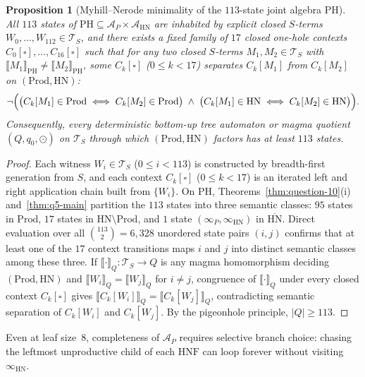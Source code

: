 \documentclass[11pt,reqno]{amsart}
\numberwithin{equation}{section}
\theoremstyle{plain}
\newtheorem{proposition}[theorem]{Proposition}
\theoremstyle{definition}
\theoremstyle{remark}
\newcommand{\TS}{\mathcal{T}_S}
\newcommand{\HNF}{\mathrm{HNF}}
\newcommand{\HN}{\mathrm{HN}}
\newcommand{\Prod}{\mathrm{Prod}}
\newcommand{\sem}[1]{\llbracket #1 \rrbracket}
\begin{document}
\begin{proposition}[Myhill--Nerode minimality of the $113$-state joint algebra $\mathrm{PH}$]\label{prop:ph-113-minimal}
All $113$ states of $\mathrm{PH} \subseteq \mathcal{A}_P \times \mathcal{A}_{\HN}$ are inhabited by explicit closed $S$-terms $W_0, \dots, W_{112} \in \TS$, and there exists a fixed family of $17$ closed one-hole contexts $C_0[\square], \dots, C_{16}[\square]$ such that for any two closed $S$-terms $M_1, M_2 \in \TS$ with $\sem{M_1}_{\mathrm{PH}} \neq \sem{M_2}_{\mathrm{PH}}$, some $C_k[\square]$ ($0 \le k < 17$) separates $C_k[M_1]$ from $C_k[M_2]$ on $(\Prod, \HN)$:
\[
\neg\Bigl(\bigl(C_k[M_1] \in \Prod \iff C_k[M_2] \in \Prod\bigr) \;\wedge\; \bigl(C_k[M_1] \in \HN \iff C_k[M_2] \in \HN\bigr)\Bigr).
\]
Consequently, every deterministic bottom-up tree automaton or magma quotient $(Q, q_0, \odot)$ on $\TS$ through which $(\Prod, \HN)$ factors has at least $113$ states.
\end{proposition}

\begin{proof}
Each witness $W_i \in \TS$ ($0 \le i < 113$) is constructed by breadth-first generation from $S$, and each context $C_k[\square]$ ($0 \le k < 17$) is an iterated left and right application chain built from $\{W_i\}$. On $\mathrm{PH}$, Theorems~\ref{thm:question-10}(i) and~\ref{thm:q5-main} partition the $113$ states into three semantic classes: $95$ states in $\Prod$, $17$ states in $\HN \setminus \Prod$, and $1$ state $(\infty_P, \infty_{\HN})$ in $\overline{\HN}$. Direct evaluation over all $\binom{113}{2} = 6{,}328$ unordered state pairs $(i, j)$ confirms that at least one of the $17$ context transitions maps $i$ and $j$ into distinct semantic classes among these three. If $\sem{\cdot}_Q \colon \TS \to Q$ is any magma homomorphism deciding $(\Prod, \HN)$ and $\sem{W_i}_Q = \sem{W_j}_Q$ for $i \neq j$, congruence of $\sem{\cdot}_Q$ under every closed context $C_k[\square]$ gives $\sem{C_k[W_i]}_Q = \sem{C_k[W_j]}_Q$, contradicting semantic separation of $C_k[W_i]$ and $C_k[W_j]$. By the pigeonhole principle, $|Q| \ge 113$.
\end{proof}

Even at leaf size~$8$, completeness of $\mathcal{A}_P$ requires selective branch choice: chasing the leftmost unproductive child of each $\HNF$ can loop forever without visiting $\infty_{\HN}$.
\end{document}
